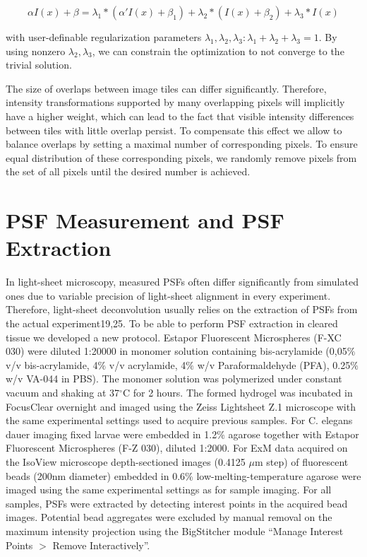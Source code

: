 \begin{equation}
\label{eq:brighness-adjust-2}
\alpha I(x) + \beta = \lambda_1 * (\alpha' I(x) + \beta_1) + \lambda_2 * (I(x) + \beta_2) + \lambda_3 * I(x) 
\end{equation}

with user-definable regularization parameters $\lambda_1, \lambda_2, \lambda_3: \lambda_1+ \lambda_2+\lambda_3 = 1$. By using nonzero $\lambda_2, \lambda_3$, we can constrain the optimization to not converge to the trivial solution.

The size of overlaps between image tiles can differ significantly. Therefore, intensity transformations supported by many overlapping pixels will implicitly have a higher weight, which can lead to the fact that visible intensity differences between tiles with little overlap persist. To compensate this effect we allow to balance overlaps by setting a maximal number of corresponding pixels. To ensure equal distribution of these corresponding pixels, we randomly remove pixels from the set of all pixels until the desired number is achieved.

\section{PSF Measurement and PSF Extraction}
\label{sec:psf}

In light-sheet microscopy, measured PSFs often differ significantly from simulated ones due to variable precision of light-sheet alignment in every experiment. Therefore, light-sheet deconvolution usually relies on the extraction of PSFs from the actual experiment19,25. To be able to perform PSF extraction in cleared tissue we developed a new protocol. Estapor Fluorescent Microspheres (F-XC 030) were diluted 1:20000 in monomer solution containing bis-acrylamide (0,05$\%$ v/v bis-acrylamide, 4$\%$ v/v acrylamide, 4$\%$ w/v Paraformaldehyde (PFA), 0.25$\%$ w/v VA-044 in PBS). The monomer solution was polymerized under constant vacuum and shaking at 37${}^\circ$C for 2 hours.  The formed hydrogel was incubated in FocusClear overnight and imaged using the Zeiss Lightsheet Z.1 microscope with the same experimental settings used to acquire previous samples. For C. elegans dauer imaging fixed larvae were embedded in 1.2$\%$ agarose together with Estapor Fluorescent Microspheres (F-Z 030), diluted 1:2000. For ExM data acquired on the IsoView microscope depth-sectioned images (0.4125 $\mu$m step) of fluorescent beads (200nm diameter) embedded in 0.6$\%$ low-melting-temperature agarose were imaged using the same experimental settings as for sample imaging. For all samples, PSFs were extracted by detecting interest points in the acquired bead images. Potential bead aggregates were excluded by manual removal on the maximum intensity projection using the BigStitcher module “Manage Interest Points $>$ Remove Interactively”.

